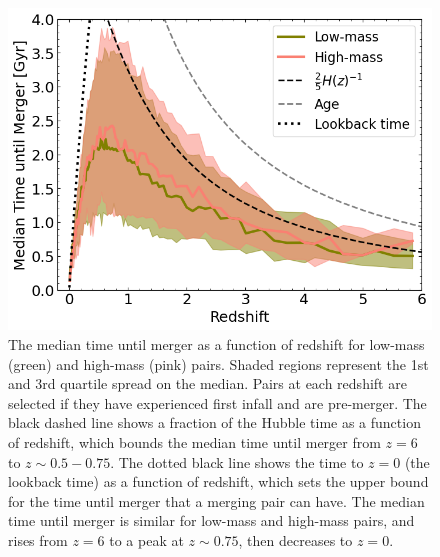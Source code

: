 \documentclass[twocolumn,linenumbers]{aastex631}
\begin{document}
    \begin{figure}[htb]
        \centering
        \includegraphics[width=\columnwidth]{plots/bet-on-it/8_timescale_mod.png}
        \caption{The median time until merger as a function of redshift for low-mass (green) and high-mass (pink) pairs. Shaded regions represent the 1st and 3rd quartile spread on the median. Pairs at each redshift are selected if they have experienced first infall and are pre-merger. 
        The black dashed line shows a fraction of the Hubble time as a function of redshift, which bounds the median time until merger from $z=6$ to $z\sim0.5-0.75$.
        The dotted black line shows the time to $z=0$ (the lookback time) as a function of redshift, which sets the upper bound for the time until merger that a merging pair can have. 
        The median time until merger is similar for low-mass and high-mass pairs, and rises from $z=6$ to a peak at $z\sim0.75$, then decreases to $z=0$.}
        \label{fig:timescales}
    \end{figure}
    
\end{document}
